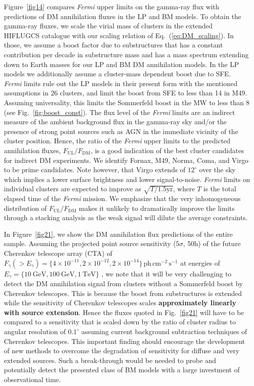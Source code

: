 \documentclass[10pt,aps,pra,reprint,amsmath,amsfonts,amssymb,showpacs,nofootinbib,floatfix]{revtex4-1}
\def\C#1{{\bf #1}}
\newcommand{\Fermi}{{\em Fermi}\xspace}
\newcommand{\rmn}{\mathrm}
\begin{document}
Figure~\ref{fig14} compares \Fermi upper limits on the gamma-ray flux
with predictions of DM annihilation fluxes in the LP and BM models.
To obtain the gamma-ray fluxes, we scale the virial mass of clusters
in the extended HIFLUGCS catalogue \cite{2002ApJ...567..716R} with our
scaling relation of Eq.~(\ref{eq:DM_scaling}). In those, we assume a
boost factor due to substructures that has a constant contribution per
decade in substructure mass and has a mass spectrum extending down to
Earth masses for our LP and BM DM annihilation models. In the LP
models we additionally assume a cluster-mass dependent boost due to
SFE. \Fermi limits rule out the LP models in their present form with
the mentioned assumptions in 26 clusters, and limit the boost from SFE
to less than 14 in M49. Assuming universality, this limits the
Sommerfeld boost in the MW to less than 8 (see
Fig.~\ref{fig:boost_const}).  The flux level of the \Fermi limits are
an indirect measure of the ambient background flux in the gamma-ray
sky and/or the presence of strong point sources such as AGN in the
immediate vicinity of the cluster position. Hence, the ratio of the
\Fermi upper limits to the predicted annihilation fluxes,
$F_{\mathrm{UL}}/F_{\mathrm{DM}}$, is a good indication of the best
cluster candidates for indirect DM experiments. We identify Fornax,
M49, Norma, Coma, and Virgo to be prime candidates. Note however, that
Virgo extends of $12^\circ$ over the sky which implies a lower surface
brightness and lower signal-to-noise.  \Fermi limits on individual
clusters are expected to improve as $\sqrt{T/1.5 \mathrm{yr}}$, where
$T$ is the total elapsed time of the \Fermi mission. We emphasize that
the very inhomogeneous distribution of $F_{\mathrm{UL}}/
F_{\mathrm{DM}}$ makes it unlikely to dramatically improve the limits
through a stacking analysis as the weak signal will dilute the average
constraints.

In Figure~\ref{fig21}, we show the DM annihilation flux predictions of
the entire sample.  Assuming the projected point source sensitivity
($5\sigma$, 50h) of the future Cherenkov telescope array (CTA) of
$F_\gamma(>E_\gamma) = \{4\times10^{-11}, 2\times10^{-12},
2\times10^{-14}\}\,\rmn{ph}\,\rmn{cm}^{-2}\,\rmn{s}^{-1}$ at energies
of $E_\gamma=\{10~\rmn{GeV}, 100~\rmn{GeV}, 1~\rmn{TeV}\}$
\cite{Doro:2009qs}, we note that it will be very challenging to detect
the DM annihilation signal from clusters without a Sommerfeld boost by
Cherenkov telescopes.  This is because the boost from substructures is
extended while the sensitivity of Cherenkov telescopes scales
\C{approximately linearly with source extension}. Hence the fluxes
quoted in Fig.~\ref{fig21} will have to be compared to a sensitivity
that is scaled down by the ratio of cluster radius to angular
resolution of $0.1^\circ$ assuming current background subtraction
techniques of Cherenkov telescopes. This important finding should
encourage the development of new methods to overcome the degradation
of sensitivity for diffuse and very extended sources. Such a
break-through would be needed to probe and potentially detect the
presented class of BM models with a large investment of observational
time.
\end{document}
